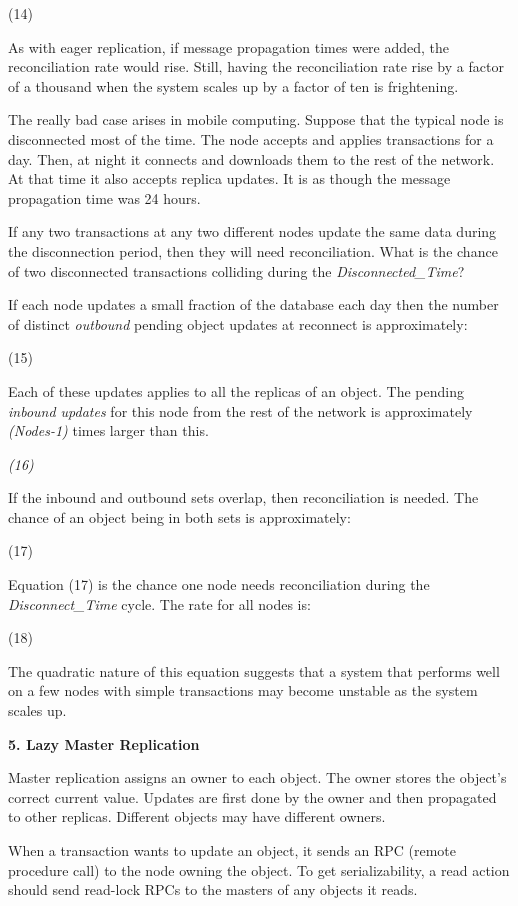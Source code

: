\documentclass[a4paper,12pt,twoside,openright]{article}
\begin{document}
(14)

As with eager replication, if message propagation times were added, the
reconciliation rate would rise. Still, having the reconciliation rate
rise by a factor of a thousand when the system scales up by a factor of
ten is frightening.

The really bad case arises in mobile computing. Suppose that the typical
node is disconnected most of the time. The node accepts and applies
transactions for a day. Then, at night it connects and downloads them to
the rest of the network. At that time it also accepts replica updates.
It is as though the message propagation time was 24 hours.

If any two transactions at any two different nodes update the same data
during the disconnection period, then they will need reconciliation.
What is the chance of two disconnected transactions colliding during the
\emph{Disconnected\_Time}?

If each node updates a small fraction of the database each day then the
number of distinct \emph{outbound} pending object updates at reconnect
is approximately:

(15)

Each of these updates applies to all the replicas of an object. The
pending \emph{inbound updates} for this node from the rest of the
network is approximately \emph{(Nodes-1)} times larger than this.

\emph{(16)}

If the inbound and outbound sets overlap, then reconciliation is needed.
The chance of an object being in both sets is approximately:

(17)

Equation (17) is the chance one node needs reconciliation during the
\emph{Disconnect\_Time} cycle. The rate for all nodes is:

(18)

The quadratic nature of this equation suggests that a system that
performs well on a few nodes with simple transactions may become
unstable as the system scales up.

\textbf{5. Lazy Master Replication}

Master replication assigns an owner to each object. The owner stores the
object's correct current value. Updates are first done by the owner and
then propagated to other replicas. Different objects may have different
owners.

When a transaction wants to update an object, it sends an RPC (remote
procedure call) to the node owning the object. To get serializability, a
read action should send read-lock RPCs to the masters of any objects it
reads.
\end{document}
